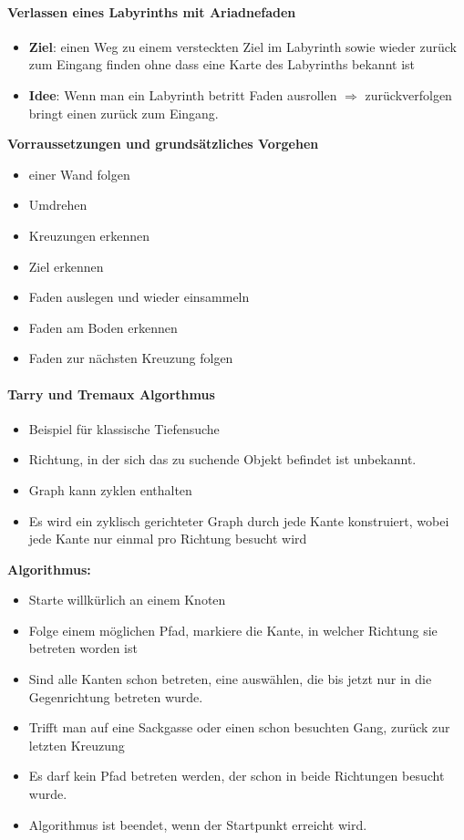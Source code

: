 \paragraph{Verlassen eines Labyrinths mit Ariadnefaden}
\begin{itemize}
	\item \textbf{Ziel}: einen Weg zu einem versteckten Ziel im Labyrinth sowie wieder zurück zum Eingang finden ohne dass eine Karte des Labyrinths bekannt ist
	\item \textbf{Idee}: Wenn man ein Labyrinth betritt Faden ausrollen $\Rightarrow$ zurückverfolgen bringt einen zurück zum Eingang.
\end{itemize}
\textbf{Vorraussetzungen und grundsätzliches Vorgehen}
\begin{itemize}
	\item einer Wand folgen
	\item Umdrehen
	\item Kreuzungen erkennen
	\item Ziel erkennen
	\item Faden auslegen und wieder einsammeln
	\item Faden am Boden erkennen
	\item Faden zur nächsten Kreuzung folgen
\end{itemize}
\paragraph{Tarry und Tremaux Algorthmus}
\begin{itemize}
	\item Beispiel für klassische Tiefensuche
	\item Richtung, in der sich das zu suchende Objekt befindet ist unbekannt.
	\item Graph kann zyklen enthalten
	\item Es wird ein zyklisch gerichteter Graph durch jede Kante konstruiert, wobei jede Kante nur einmal pro Richtung besucht wird
\end{itemize}
\textbf{Algorithmus:}
\begin{itemize}
	\item Starte willkürlich an einem Knoten
	\item Folge einem möglichen Pfad, markiere die Kante, in welcher Richtung sie betreten worden ist
	\item Sind alle Kanten schon betreten, eine auswählen, die bis jetzt nur in die Gegenrichtung betreten wurde.
	\item Trifft man auf eine Sackgasse oder einen schon besuchten Gang, zurück zur letzten Kreuzung
	\item Es darf kein Pfad betreten werden, der schon in beide Richtungen besucht wurde.
	\item Algorithmus ist beendet, wenn der Startpunkt erreicht wird.
\end{itemize}
